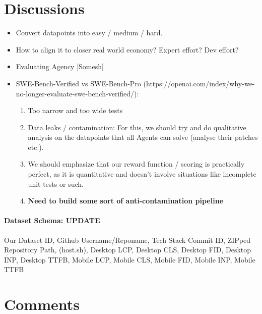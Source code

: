 \section{Discussions}
\begin{itemize}
    \item Convert datapoints into easy / medium / hard.
    \item How to align it to closer real world economy? Expert effort? Dev effort?
    \item Evaluating Agency [Somesh]
    \item SWE-Bench-Verified vs SWE-Bench-Pro (https://openai.com/index/why-we-no-longer-evaluate-swe-bench-verified/):
    \begin{enumerate}
        \item Too narrow and too wide tests
        \item Data leaks / contamination: For this, we should try and do qualitative analysis on the datapoints that all Agents can solve (analyse their patches etc.). 
        \item We should emphasize that our reward function / scoring is practically perfect, as it is quantitative and doesn't involve situations like incomplete unit tests or such.
        \item \textbf{Need to build some sort of anti-contamination pipeline}
    \end{enumerate}
\end{itemize}
    
\paragraph{Dataset Schema: UPDATE}
Our Dataset
ID, Github Username/Reponame, Tech Stack Commit ID, ZIPped Repository Path, (host.sh), {Desktop LCP, Desktop CLS, Desktop FID, Desktop INP, Desktop TTFB, Mobile LCP, Mobile CLS, Mobile FID, Mobile INP, Mobile TTFB}

\section{Comments}

